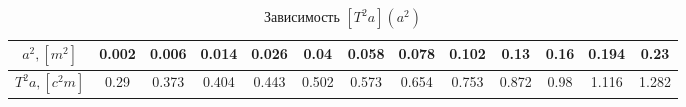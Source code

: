 \documentclass[12pt]{article}
\begin{document}
\begin{enumerate}
        \begin{table}[h]
            \caption{Зависимость $[T^2 a ](a^2)$}
            \begin{center}
                \begin{tabular}{|c|c|c|c|c|c|c|c|c|c|c|c|c|}
                    \hline
                        $a^2 , [m^2]$ & 0.002 & 0.006 & 0.014 & 0.026 & 0.04 & 0.058 & 0.078 & 0.102 & 0.13 & 0.16 & 0.194 & 0.23 \\
                    \hline
                        $T^2 a , [c^2 m] $ & 0.29 & 0.373 & 0.404 & 0.443 & 0.502 & 0.573 & 0.654 & 0.753 & 0.872 & 0.98 & 1.116 & 1.282 \\
                    \hline
                \end{tabular}
            \end{center}
        \end{table}


\end{enumerate}
\end{document}
